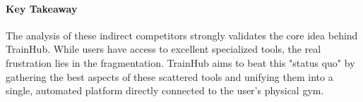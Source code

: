 \paragraph{Key Takeaway}
The analysis of these indirect competitors strongly validates the core idea behind TrainHub. While users have access to excellent specialized tools, the real frustration lies in the fragmentation. TrainHub aims to beat this "status quo" by gathering the best aspects of these scattered tools and unifying them into a single, automated platform directly connected to the user's physical gym.
